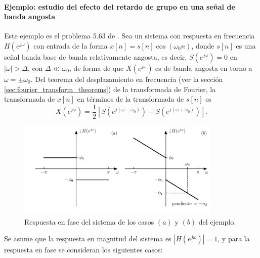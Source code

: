 \documentclass[a4paper]{report}
\begin{document}
\paragraph{Ejemplo: estudio del efecto del retardo de grupo en una señal de banda angosta} Este ejemplo es el problema 5.63 de \cite{oppenheim2009discrete}. Sea un sistema con respuesta en frecuencia \(H(e^{j\omega})\) con entrada de la forma \(x[n]=s[n]\cos(\omega_0n)\), donde \(s[n]\) es una señal banda base de banda relativamente angosta, es decir, \(S(e^{j\omega})=0\) en \(|\omega|>\Delta\), con \(\Delta\ll\omega_0\), de forma de que \(X(e^{j\omega})\) es de banda angosta en torno a \(\omega=\pm\omega_0\). Del teorema del desplazamiento en frecuencia (ver la sección \ref{sec:fourier_transform_theorems}) de la transformada de Fourier, la transformada de \(x[n]\) en términos de la transformada de \(s[n]\) es
\[
 X(e^{j\omega})=\frac{1}{2}\left[S(e^{j(\omega-\omega_0)})+S(e^{j(\omega+\omega_0)})\right].
\]
\begin{figure}[!htb]
 \begin{center}
 \includegraphics[width=0.87\textwidth]{figuras/problem_5_63_phase_responses.pdf}
 \caption{\label{fig:problem_5_63_phase_responses} Respuesta en fase del sistema de los casos \((a)\) y \((b)\) del ejemplo.}
 \end{center}
\end{figure}
Se asume que la respuesta en magnitud del sistema es \(|H(e^{j\omega})|=1\), y para la respuesta en fase se consideran los siguientes casos:
\end{document}
